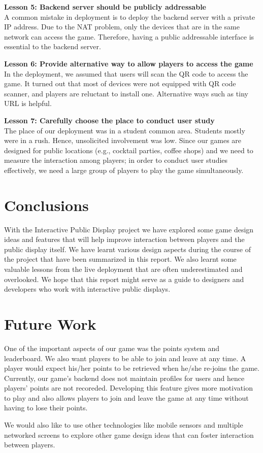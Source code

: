 \documentclass{sig-alternate}
\begin{document}
\textbf{Lesson 5: Backend server should be publicly addressable}\\
A common mistake in 
deployment is to deploy the backend server with a private IP address. Due to 
the NAT problem, only the devices that are in the same network can access the 
game. Therefore, having a public addressable interface is essential to the backend server.

\textbf{Lesson 6: Provide alternative way to allow players to access the game}\\
In the deployment, we assumed 
that users will scan the QR code to access the game. It turned out that most of devices 
were not equipped with QR code scanner, and players are reluctant to install one. 
Alternative ways such as tiny URL is helpful. 

\textbf{Lesson 7: Carefully choose the place to conduct user study}\\
The place of our deployment was in 
a student common area. Students mostly were in a rush. Hence, unsolicited involvement 
was low. Since our games are designed for public locations (e.g., cocktail parties, coffee shops) and we need to measure the interaction among players; in order to conduct user studies effectively, we need a large group of players to play the game simultaneously.

\section{Conclusions}
With the Interactive Public Display project we have explored some game design ideas and features that will help 
improve interaction between players and the public display itself. We have learnt various design aspects during 
the course of the project that have been summarized in this report. We also learnt some valuable lessons from the 
live deployment that are often underestimated and overlooked\cite{storz:deployment_lessons}. We hope that this report might serve as a guide to 
designers and developers who work with interactive public displays.

\section{Future Work}
One of the important aspects of our game was the points system and leaderboard. We also want players to be able to join and leave at any time. A player would expect his/her points to be retrieved when 
he/she re-joins the game. 
Currently, our game's backend does not maintain profiles for users and hence players' points are not recoreded. Developing this feature gives more motivation to play and also allows players to join 
and leave the game at any time without having 
to lose their points.

We would also like to use other technologies like mobile sensors and multiple networked screens to explore other 
game design ideas that can foster interaction between players.



\end{document}
